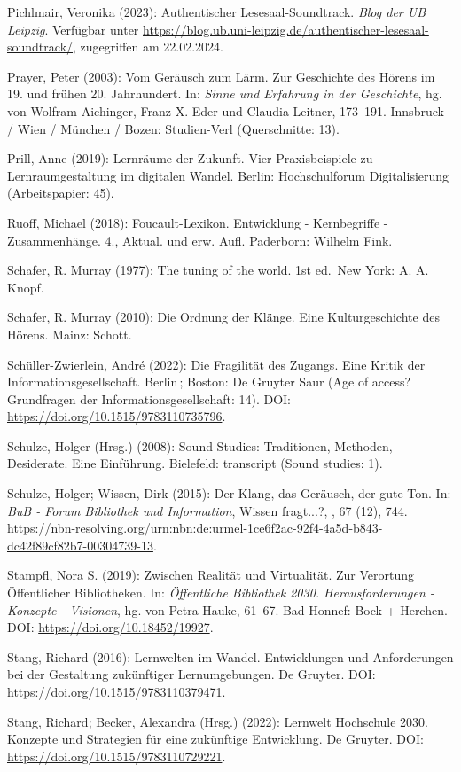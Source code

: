 \documentclass[a4paper,
fontsize=11pt,
oneside,
numbers=noperiodatend,
parskip=half-,
bibliography=totoc,
final
]{scrartcl}
\begin{document}
Pichlmair, Veronika (2023): Authentischer Lesesaal-Soundtrack.
\emph{Blog der UB Leipzig}. Verfügbar unter
\url{https://blog.ub.uni-leipzig.de/authentischer-lesesaal-soundtrack/},
zugegriffen am 22.02.2024.

Prayer, Peter (2003): Vom Geräusch zum Lärm. Zur Geschichte des Hörens
im 19. und frühen 20. Jahrhundert. In: \emph{Sinne und Erfahrung in der
Geschichte}, hg. von Wolfram Aichinger, Franz X. Eder und Claudia
Leitner, 173--191. Innsbruck / Wien / München / Bozen: Studien-Verl
(Querschnitte: 13).

Prill, Anne (2019): Lernräume der Zukunft. Vier Praxisbeispiele zu
Lernraumgestaltung im digitalen Wandel. Berlin: Hochschulforum
Digitalisierung (Arbeitspapier: 45).

Ruoff, Michael (2018): Foucault-Lexikon. Entwicklung - Kernbegriffe -
Zusammenhänge. 4., Aktual. und erw. Aufl. Paderborn: Wilhelm Fink.

Schafer, R. Murray (1977): The tuning of the world. 1st ed.~New York: A.
A. Knopf.

Schafer, R. Murray (2010): Die Ordnung der Klänge. Eine Kulturgeschichte
des Hörens. Mainz: Schott.

Schüller-Zwierlein, André (2022): Die Fragilität des Zugangs. Eine
Kritik der Informationsgesellschaft. Berlin\,; Boston: De Gruyter Saur
(Age of access? Grundfragen der Informationsgesellschaft: 14). DOI:
\url{https://doi.org/10.1515/9783110735796}.

Schulze, Holger (Hrsg.) (2008): Sound Studies: Traditionen, Methoden,
Desiderate. Eine Einführung. Bielefeld: transcript (Sound studies: 1).

Schulze, Holger; Wissen, Dirk (2015): Der Klang, das Geräusch, der gute
Ton. In: \emph{BuB - Forum Bibliothek und Information}, Wissen
fragt...?, , 67 (12), 744.
\url{https://nbn-resolving.org/urn:nbn:de:urmel-1ce6f2ac-92f4-4a5d-b843-dc42f89cf82b7-00304739-13}.

Stampfl, Nora S. (2019): Zwischen Realität und Virtualität. Zur
Verortung Öffentlicher Bibliotheken. In: \emph{Öffentliche Bibliothek
2030. Herausforderungen - Konzepte - Visionen}, hg. von Petra Hauke,
61--67. Bad Honnef: Bock + Herchen. DOI:
\url{https://doi.org/10.18452/19927}.

Stang, Richard (2016): Lernwelten im Wandel. Entwicklungen und
Anforderungen bei der Gestaltung zukünftiger Lernumgebungen. De Gruyter.
DOI: \url{https://doi.org/10.1515/9783110379471}.

Stang, Richard; Becker, Alexandra (Hrsg.) (2022): Lernwelt Hochschule
2030. Konzepte und Strategien für eine zukünftige Entwicklung. De
Gruyter. DOI: \url{https://doi.org/10.1515/9783110729221}.
\end{document}
